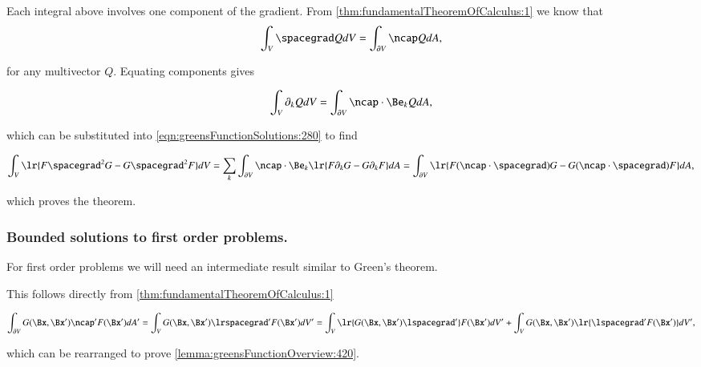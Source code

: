 Each integral above involves one component of the gradient.
From
\cref{thm:fundamentalTheoremOfCalculus:1}
we know that
\begin{dmath}\label{eqn:greensFunctionSolutions:300}
\int_V \spacegrad Q dV = \int_{\partial V} \ncap Q dA,
\end{dmath}

for any multivector \( Q \).
Equating components gives

\begin{dmath}\label{eqn:greensFunctionSolutions:460}
\int_V \partial_k Q dV = \int_{\partial V} \ncap \cdot \Be_k Q dA,
\end{dmath}

which can be substituted into \cref{eqn:greensFunctionSolutions:280} to find

\begin{dmath}\label{eqn:greensFunctionSolutions:480}
\int_V \lr{ F \spacegrad^2 G - G \spacegrad^2 F } dV
=
\sum_k \int_{\partial V} \ncap \cdot \Be_k \lr{ F \partial_k G - G \partial_k F } dA
=
\int_{\partial V} \lr{ F (\ncap \cdot \spacegrad) G - G (\ncap \cdot \spacegrad) F } dA,
\end{dmath}

which proves the theorem.

\subsubsection{Bounded solutions to first order problems.}

For first order problems we will need an intermediate result similar to Green's theorem.


This follows directly from \cref{thm:fundamentalTheoremOfCalculus:1}

\begin{dmath}\label{eqn:greensFunctionSolutions:440}
\int_{\partial V} G(\Bx, \Bx') \ncap' F(\Bx') dA'
=
\int_V G(\Bx, \Bx') \lrspacegrad' F(\Bx') dV'
=
\int_V \lr{ G(\Bx, \Bx') \lspacegrad' } F(\Bx') dV'
+
\int_V G(\Bx, \Bx') \lr{ \lspacegrad' F(\Bx') } dV',
\end{dmath}

which can be rearranged to prove \cref{lemma:greensFunctionOverview:420}.

